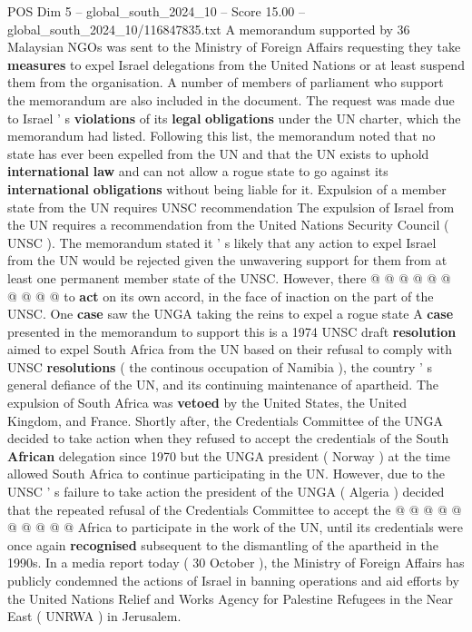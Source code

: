 \begin{textsample}{POS Dim 5 – global\_south\_2024\_10 – Score 15.00 – global\_south\_2024\_10/116847835.txt}  \label{ex:f5_pos_327}
A memorandum supported by 36 Malaysian NGOs was sent to the Ministry of Foreign Affairs requesting they take \textbf{measures} to expel Israel delegations from the United Nations or at least suspend them from the organisation.
A number of members of parliament who support the memorandum are also included in the document.
The request was made due to Israel ' s \textbf{violations} of its \textbf{legal} \textbf{obligations} under the UN charter, which the memorandum had listed.
Following this list, the memorandum noted that no state has ever been expelled from the UN and that the UN exists to uphold \textbf{international} \textbf{law} and can not allow a rogue state to go against its \textbf{international} \textbf{obligations} without being liable for it.
Expulsion of a member state from the UN requires UNSC recommendation The expulsion of Israel from the UN requires a recommendation from the United Nations Security Council ( UNSC ).
The memorandum stated it ' s likely that any action to expel Israel from the UN would be rejected given the unwavering support for them from at least one permanent member state of the UNSC.
However, there @ @ @ @ @ @ @ @ @ @ to \textbf{act} on its own accord, in the face of inaction on the part of the UNSC.
One \textbf{case} saw the UNGA taking the reins to expel a rogue state A \textbf{case} presented in the memorandum to support this is a 1974 UNSC draft \textbf{resolution} aimed to expel South Africa from the UN based on their refusal to comply with UNSC \textbf{resolutions} ( the continous occupation of Namibia ), the country ' s general defiance of the UN, and its continuing maintenance of apartheid.
The expulsion of South Africa was \textbf{vetoed} by the United States, the United Kingdom, and France.
Shortly after, the Credentials Committee of the UNGA decided to take action when they refused to accept the credentials of the South \textbf{African} delegation since 1970 but the UNGA president ( Norway ) at the time allowed South Africa to continue participating in the UN.
However, due to the UNSC ' s failure to take action the president of the UNGA ( Algeria ) decided that the repeated refusal of the Credentials Committee to accept the @ @ @ @ @ @ @ @ @ @ Africa to participate in the work of the UN, until its credentials were once again \textbf{recognised} subsequent to the dismantling of the apartheid in the 1990s.
In a media report today ( 30 October ), the Ministry of Foreign Affairs has publicly condemned the actions of Israel in banning operations and aid efforts by the United Nations Relief and Works Agency for Palestine Refugees in the Near East ( UNRWA ) in Jerusalem.

\end{textsample}
